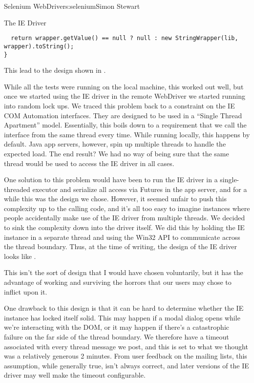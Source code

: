 \begin{aosachapter}{Selenium WebDriver}{s:selenium}{Simon Stewart}
\begin{aosasect1}{The IE Driver}
\begin{verbatim}
  return wrapper.getValue() == null ? null : new StringWrapper(lib, wrapper).toString();
}
\end{verbatim}

\noindent This lead to the design shown in .


While all the tests were running on the local machine, this worked out
well, but once we started using the IE driver in the remote WebDriver
we started running into random lock ups. We traced this problem back
to a constraint on the IE COM Automation interfaces. They are designed
to be used in a ``Single Thread Apartment'' model. Essentially, this
boils down to a requirement that we call the interface from the same
thread every time. While running locally, this happens by
default. Java app servers, however, spin up multiple threads to handle
the expected load. The end result? We had no way of being sure that
the same thread would be used to access the IE driver in all cases.

One solution to this problem would have been to run the IE driver in a
single-threaded executor and serialize all access via Futures in the
app server, and for a while this was the design we chose. However, it
seemed unfair to push this complexity up to the calling code, and it's
all too easy to imagine instances where people accidentally make use
of the IE driver from multiple threads. We decided to sink the
complexity down into the driver itself. We did this by holding the IE
instance in a separate thread and using the 
Win32 API to communicate across the thread boundary. Thus, at the time
of writing, the design of the IE driver looks like
.


This isn't the sort of design that I would have chosen voluntarily,
but it has the advantage of working and surviving the horrors that our
users may chose to inflict upon it.

One drawback to this design is that it can be hard to determine
whether the IE instance has locked itself solid. This may happen if a
modal dialog opens while we're interacting with the DOM, or it may
happen if there's a catastrophic failure on the far side of the thread
boundary. We therefore have a timeout associated with every thread
message we post, and this is set to what we thought was a relatively
generous 2 minutes. From user feedback on the mailing lists, this
assumption, while generally true, isn't always correct, and later
versions of the IE driver may well make the timeout configurable.


\end{aosasect1}
\end{aosachapter}
